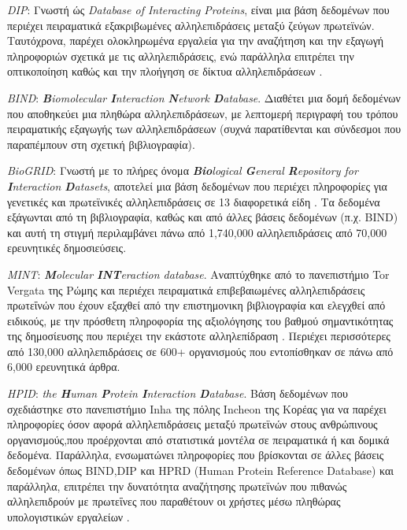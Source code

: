 \medskip
\textit{DIP}: Γνωστή ώς \textit{Database of Interacting Proteins}, είναι μια βάση δεδομένων που περιέχει πειραματικά εξακριβωμένες αλληλεπιδράσεις μεταξύ ζεύγων πρωτεϊνών. Ταυτόχρονα, παρέχει ολοκληρωμένα εργαλεία για την αναζήτηση και την εξαγωγή πληροφοριών σχετικά με τις αλληλεπιδράσεις, ενώ παράλληλα επιτρέπει την οπτικοποίηση καθώς και την πλοήγηση σε δίκτυα αλληλεπιδράσεων \cite{Xenarios2001}.

\medskip
\textit{BIND}: \textit{\textbf{B}iomolecular \textbf{I}nteraction \textbf{N}etwork \textbf{D}atabase}. Διαθέτει μια δομή δεδομένων που αποθηκεύει μια πληθώρα αλληλεπιδράσεων, με λεπτομερή περιγραφή του τρόπου πειραματικής εξαγωγής των αλληλεπιδράσεων (συχνά παρατίθενται και σύνδεσμοι που παραπέμπουν στη σχετική βιβλιογραφία).

\medskip
\textit{BioGRID}: Γνωστή με το πλήρες όνομα \textit{\textbf{Bio}logical \textbf{G}eneral \textbf{R}epository for \textbf{I}nteraction \textbf{D}atasets}, αποτελεί μια βάση δεδομένων που περιέχει πληροφορίες για γενετικές και πρωτεϊνικές αλληλεπιδράσεις σε 13 διαφορετικά είδη \cite{Stark2006}. Τα δεδομένα εξάγωνται από τη βιβλιογραφία, καθώς και από άλλες βάσεις δεδομένων (π.χ. BIND) και αυτή τη στιγμή περιλαμβάνει πάνω από 1,740,000 αλληλεπιδράσεις από 70,000 ερευνητικές δημοσιεύσεις.

\medskip
\textit{MINT}: \textit{\textbf{M}olecular \textbf{INT}eraction database}. Αναπτύχθηκε από το πανεπιστήμιο Tor Vergata της Ρώμης και περιέχει πειραματικά επιβεβαιωμένες αλληλεπιδράσεις πρωτεΐνών που έχουν εξαχθεί από την επιστημονικη βιβλιογραφία και ελεγχθεί από ειδικούς, με την πρόσθετη πληροφορία της αξιολόγησης του βαθμού σημαντικότητας της δημοσίευσης που περιέχει την εκάστοτε αλληλεπίδραση \cite{Zanzoni2001}. Περιέχει περισσότερες από 130,000 αλληλεπιδράσεις σε 600+ οργανισμούς που εντοπίσθηκαν σε πάνω από 6,000 ερευνητικά άρθρα. 

\medskip
\textit{HPID}: \textit{the \textbf{H}uman \textbf{P}rotein \textbf{I}nteraction \textbf{D}atabase}. Βάση δεδομένων που σχεδιάστηκε στο πανεπιστήμιο Inha της πόλης Incheon της Κορέας για να παρέχει πληροφορίες όσον αφορά αλληλεπιδράσεις μεταξύ πρωτεϊνών στους ανθρώπινους οργανισμούς,που προέρχονται από στατιστικά μοντέλα σε πειραματικά ή και δομικά δεδομένα. Παράλληλα, ενσωματώνει πληροφορίες που βρίσκονται σε άλλες βάσεις δεδομένων όπως BIND,DIP και HPRD (Human Protein Reference Database) και παράλληλα, επιτρέπει την δυνατότητα αναζήτησης πρωτεϊνών που πιθανώς αλληλεπιδρούν με πρωτεΐνες που παραθέτουν οι χρήστες μέσω πληθώρας υπολογιστικών εργαλείων \cite{Han2004}.

